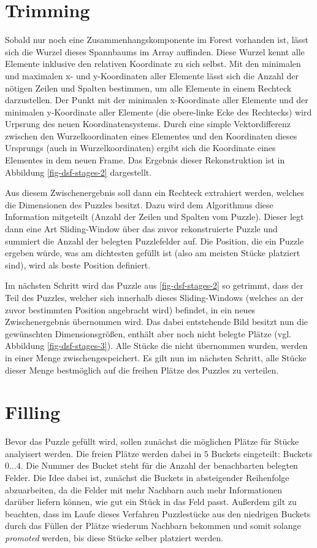 \documentclass{whswinvcbook}
\begin{document}
\section{Trimming}
Sobald nur noch eine Zusammenhangskomponente im Forest vorhanden ist, lässt sich die Wurzel dieses Spannbaums im Array auffinden. Diese Wurzel kennt alle Elemente inklusive den relativen Koordinate zu sich selbst. Mit den minimalen und maximalen x- und y-Koordinaten aller Elemente lässt sich die Anzahl der nötigen Zeilen und Spalten bestimmen, um alle Elemente in einem Rechteck darzustellen. Der Punkt mit der minimalen x-Koordinate aller Elemente und der minimalen y-Koordinate aller Elemente (die obere-linke Ecke des Rechtecks) wird Urpsrung des neuen Koordinatensystems. Durch eine simple Vektordifferenz zwischen den Wurzelkoordinaten eines Elementes und den Koordinaten dieses Ursprungs (auch in Wurzelkoordinaten) ergibt sich die Koordinate eines Elementes in dem neuen Frame. Das Ergebnis dieser Rekonstruktion ist in Abbildung \ref{fig-dsf-stages-2} dargestellt.

Aus diesem Zwischenergebnis soll dann ein Rechteck extrahiert werden, welches die Dimensionen des Puzzles besitzt. Dazu wird dem Algorithmus diese Information mitgeteilt (Anzahl der Zeilen und Spalten vom Puzzle). Dieser legt dann eine Art Sliding-Window über das zuvor rekonstruierte Puzzle und summiert die Anzahl der belegten Puzzlefelder auf. Die Position, die ein Puzzle ergeben würde, was am dichtesten gefüllt ist (also am meisten Stücke platziert sind), wird als beste Position definiert.

Im nächsten Schritt wird das Puzzle aus \ref{fig-dsf-stages-2} so getrimmt, dass der Teil des Puzzles, welcher sich innerhalb dieses Sliding-Windows (welches an der zuvor bestimmten Position angebracht wird) befindet, in ein neues Zwischenergebnis übernommen wird. Das dabei entstehende Bild besitzt nun die gewünschten Dimensionsgrößen, enthält aber noch nicht belegte Plätze (vgl. Abbildung \ref{fig-dsf-stages-3}). Alle Stücke die nicht übernommen wurden, werden in einer Menge zwischengespeichert. Es gilt nun im nächsten Schritt, alle Stücke dieser Menge bestmöglich auf die freihen Plätze des Puzzles zu verteilen.
\section{Filling}
Bevor das Puzzle gefüllt wird, sollen zunächst die möglichen Plätze für Stücke analyisert werden. Die freien Plätze werden dabei in $5$ Buckets eingeteilt: Buckets $0\dots4$. Die Nummer des Bucket steht für die Anzahl der benachbarten belegten Felder. Die Idee dabei ist, zunächst die Buckets in absteigender Reihenfolge abzuarbeiten, da die Felder mit mehr Nachbarn auch mehr Informationen darüber liefern können, wie gut ein Stück in das Feld passt. Außerdem gilt zu beachten, dass im Laufe dieses Verfahren Puzzlestücke aus den niedrigen Buckets durch das Füllen der Plätze wiederum Nachbarn bekommen und somit solange \textit{promoted} werden, bis diese Stücke selber platziert werden.
\end{document}
